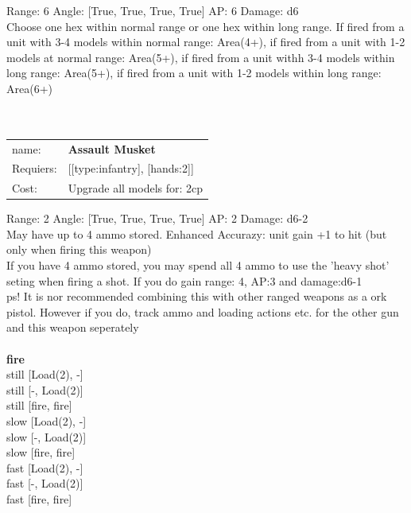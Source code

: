 Range: 6  Angle: [True, True, True, True] AP: 6 Damage: d6 \\
Choose one hex within normal range or one hex within long range. If fired from a unit with 3-4 models within normal range: Area(4+), if fired from a unit with 1-2 models at normal range: Area(5+), if fired from a unit withh 3-4 models within long range: Area(5+), if fired from a unit with 1-2 models within long range: Area(6+)\\ 








\ \\
\ \\
\begin{tabular}{ll}
name: & {\bf Assault Musket } \\
Requiers: & [[type:infantry], [hands:2]] \\
Cost: & Upgrade all models for: 2cp \\
\end{tabular}



Range: 2  Angle: [True, True, True, True] AP: 2 Damage: d6-2 \\
May have up to 4 ammo stored. Enhanced Accurazy: unit gain +1 to hit (but only when firing this weapon)\\ 
If you have 4 ammo stored, you may spend all 4 ammo to use the 'heavy shot' seting when firing a shot. If you do gain range: 4, AP:3 and damage:d6-1\\ 
 ps! It is nor recommended combining this with other ranged weapons as a ork pistol. However if you do, track ammo and loading actions etc. for the other gun and this weapon seperately\\ 







\ \\ {\bf fire } \\
still [Load(2), -] \\
still [-, Load(2)] \\
still [fire, fire] \\
slow [Load(2), -] \\
slow [-, Load(2)] \\
slow [fire, fire] \\
fast [Load(2), -] \\
fast [-, Load(2)] \\
fast [fire, fire] \\

\ \\
